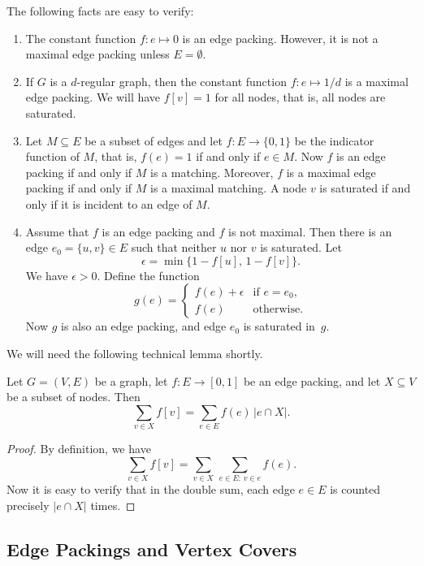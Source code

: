 The following facts are easy to verify:
\begin{enumerate}
    \item The constant function $f \colon e \mapsto 0$ is an edge packing. However, it is not a maximal edge packing unless $E = \emptyset$.
    \item If $G$ is a $d$-regular graph, then the constant function $f \colon e \mapsto 1/d$ is a maximal edge packing. We will have $f[v] = 1$ for all nodes, that is, all nodes are saturated.
    \item Let $M \subseteq E$ be a subset of edges and let $f\colon E \to \{0,1\}$ be the indicator function of $M$, that is, $f(e) = 1$ if and only if $e \in M$. Now $f$ is an edge packing if and only if $M$ is a matching. Moreover, $f$ is a maximal edge packing if and only if $M$ is a maximal matching. A node $v$ is saturated if and only if it is incident to an edge of $M$.
    \item Assume that $f$ is an edge packing and $f$ is not maximal. Then there is an edge $e_0 = \{u,v\} \in E$ such that neither $u$ nor $v$ is saturated. Let
    \[
        \epsilon = \min \bigl\{ 1-f[u],\, 1-f[v] \bigr\}.
    \]
    We have $\epsilon > 0$. Define the function
    \[
        g(e) = \begin{cases}
            f(e) + \epsilon & \text{if } e = e_0, \\
            f(e) & \text{otherwise}.
        \end{cases}
    \]
    Now $g$ is also an edge packing, and edge $e_0$ is saturated in~$g$.
\end{enumerate}

We will need the following technical lemma shortly.

\begin{lemma}\label{lem:eptech}
    Let $G = (V,E)$ be a graph, let $f\colon E \to [0,1]$ be an edge packing, and let $X \subseteq V$ be a subset of nodes. Then
    \[
        \sum_{v \in X} f[v] = \sum_{e \in E} f(e) \, |e \cap X|.
    \]
\end{lemma}
\begin{proof}
    By definition, we have
    \[
        \sum_{v \in X} f[v] = \sum_{v \in X} \, \sum_{e \in E :\, v \in e} f(e).
    \]
    Now it is easy to verify that in the double sum, each edge $e \in E$ is counted precisely $|e \cap X|$ times.
\end{proof}


\subsection{Edge Packings and Vertex Covers}

